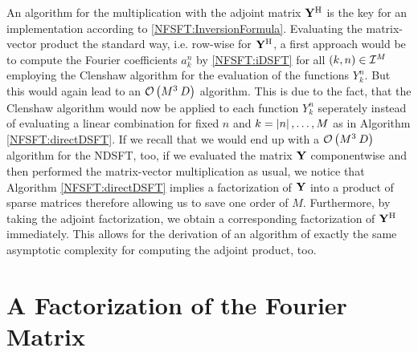 An algorithm for the multiplication with the adjoint matrix $\mathbf{Y}^{\text{\rm{H}}}$ is the key for an implementation according to \eqref{NFSFT:InversionFormula}. Evaluating the matrix-vector product the standard way, i.e. row-wise for $\mathbf{Y}^{\text{\rm{H}}}$, a first approach would be to compute the Fourier coefficients $a_{k}^n$ by \eqref{NFSFT:iDSFT} for all $\left(k,n\right) \in \mathcal{I}^M$ employing the Clenshaw algorithm for the evaluation of the functions $Y_{k}^n$. But this would again lead to an $\mathcal{O}\left(M^3 \: D\right)$ algorithm. This is due to the fact, that the Clenshaw algorithm would now be applied to each function $Y_{k}^n$ seperately instead of evaluating a linear combination for fixed $n$ and $k = \left\vert n\right\vert,\dots,M$ as in Algorithm \ref{NFSFT:directDSFT}. If we recall that we would end up with a $\mathcal{O}\left(M^3 \: D\right)$ algorithm for the NDSFT, too, if we evaluated the matrix $\mathbf{Y}$ componentwise and then performed the matrix-vector multiplication as usual, we notice that Algorithm \ref{NFSFT:directDSFT} implies a factorization of $\mathbf{Y}$ into a product of sparse matrices therefore allowing us to save one order of $M$. Furthermore, by taking the adjoint factorization, we obtain a corresponding factorization of $\mathbf{Y}^{\text{\rm{H}}}$ immediately. This allows for the derivation of an algorithm of exactly the same asymptotic complexity for computing the adjoint product, too.

\section{A Factorization of the Fourier Matrix}

